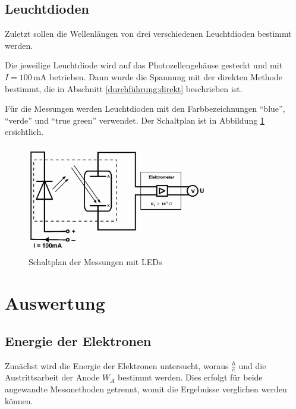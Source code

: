 \documentclass[12pt,a4paper]{scrartcl}
\numberwithin{equation}{section} %
\begin{document}
\subsection{Leuchtdioden}

Zuletzt sollen die Wellenlängen von drei verschiedenen Leuchtdioden bestimmt werden.

Die jeweilige Leuchtdiode wird auf das Photozellengehäuse gesteckt und mit $I=100\mathrm{\,mA}$ betrieben. Dann wurde die Spannung mit der direkten Methode bestimmt, die in Abschnitt \ref{durchführung:direkt} beschrieben ist.

Für die Messungen werden Leuchtdioden mit den Farbbezeichnungen ``blue'', ``verde'' und ``true green'' verwendet. Der Schaltplan ist in Abbildung \ref{fig:Schaltplan LEDs} ersichtlich.

\begin{figure}[h!]
	\centering
	\includegraphics[width=0.7\textwidth]{../media/B1.4/Schaltplan_LED.jpg}
	\caption{Schaltplan der Messungen mit LEDs}
	\label{fig:Schaltplan LEDs}
\end{figure}


\clearpage
\hypertarget{auswertung}{\section{Auswertung}\label{auswertung}}
\subsection{Energie der Elektronen}
\label{auswertung:h/e}

Zunächst wird die Energie der Elektronen untersucht, woraus $\frac{h}{e}$ und die Austrittsarbeit der Anode $W_A$ bestimmt werden. Dies erfolgt für beide angewandte Messmethoden getrennt, womit die Ergebnisse verglichen werden können.
\end{document}
